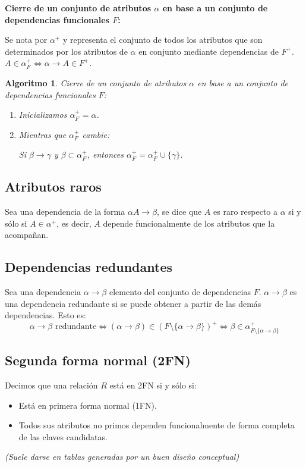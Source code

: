 \documentclass[12pt,a4paper]{article}
\theoremstyle{ejemplo}
\theoremstyle{algoritmo}
\newtheorem*{alg}{Algoritmo} %
\begin{document}
\textbf{Cierre de un conjunto de atributos $\alpha$ en base a un conjunto de 
dependencias funcionales $F$:}

Se nota por $\alpha^+$ y representa el conjunto de todos los atributos que son 
determinados por los atributos de $\alpha$ en conjunto mediante dependencias 
de $F^+$. $A\in\alpha_F^+\iff\alpha\to A\in F^+$.

\begin{alg}
Cierre de un conjunto de atributos $\alpha$ en base a un conjunto de 
dependencias funcionales $F$:
\begin{enumerate}[noitemsep]
	\item Inicializamos $\alpha_F^+=\alpha$.
	\item Mientras que $\alpha_F^+$ cambie:
	
	\quad\quad Si $\beta\to\gamma$ y $\beta\subset\alpha_F^+$, entonces $
	\alpha_F^+=\alpha_F^+\cup\{\gamma\}$.
\end{enumerate}
\end{alg}

\subsection*{Atributos raros}
Sea una dependencia de la forma $\alpha A\to\beta$, se dice que $A$ es
raro respecto a $\alpha$ si y sólo si $A\in\alpha^+$, es decir, $A$ depende
funcionalmente de los atributos que la acompañan.

\subsection*{Dependencias redundantes}
Sea una dependencia $\alpha\to\beta$ elemento del conjunto de dependencias $F$.
$\alpha\to\beta$ es una dependencia redundante si se puede obtener a partir de
las demás dependencias. Esto es:
$$\alpha\to\beta\text{ redundante}\iff(\alpha\to\beta)\in(F\setminus\{\alpha
\to\beta\})^+\iff\beta\in\alpha^+_{F\setminus\{\alpha\to\beta\}}$$

\subsection*{Segunda forma normal (2FN)}
Decimos que una relación $R$ está en 2FN si y sólo si:
\begin{itemize}[noitemsep]
	\item Está en primera forma normal (1FN).
	\item Todos sus atributos no primos dependen funcionalmente de forma 
	completa de las claves candidatas.
\end{itemize}
\textit{(Suele darse en tablas generadas por un buen diseño conceptual)}
\end{document}
